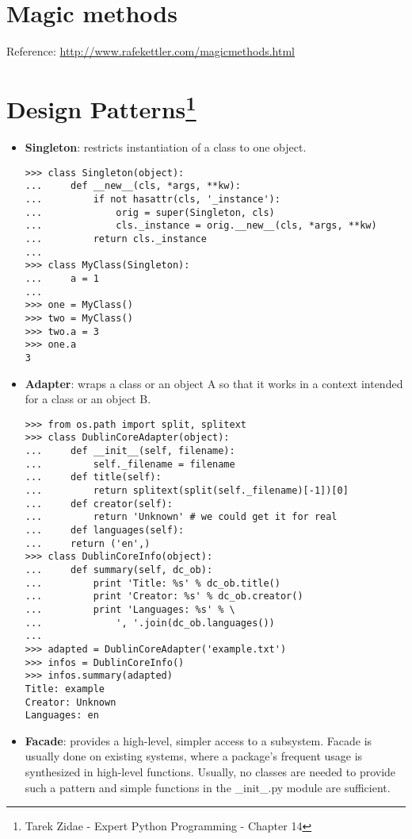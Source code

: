 \documentclass[fleqn,10pt]{SelfArx} %
\begin{document}
	
	\section{Magic methods}

	Reference: \url{http://www.rafekettler.com/magicmethods.html}
	
	\section[Design Patterns]{Design Patterns\footnote{Tarek Zidae - Expert Python Programming - Chapter 14}}

	\begin{itemize}
		\item \textbf{Singleton}: restricts instantiation of a class to one object.
		
	\begin{lstlisting}
>>> class Singleton(object):
... 	def __new__(cls, *args, **kw):
... 		if not hasattr(cls, '_instance'):
... 			orig = super(Singleton, cls)
... 			cls._instance = orig.__new__(cls, *args, **kw)
... 		return cls._instance
... 
>>> class MyClass(Singleton):
... 	a = 1
... 
>>> one = MyClass()
>>> two = MyClass()
>>> two.a = 3
>>> one.a
3
	\end{lstlisting}	
		
		\item \textbf{Adapter}: wraps a class or an object A so that it works in a context intended for a class or an object B.
		
	\begin{lstlisting}
>>> from os.path import split, splitext
>>> class DublinCoreAdapter(object):
... 	def __init__(self, filename):
... 		self._filename = filename
... 	def title(self):
... 		return splitext(split(self._filename)[-1])[0]
... 	def creator(self):
... 		return 'Unknown' # we could get it for real
... 	def languages(self):
... 	return ('en',)
>>> class DublinCoreInfo(object):
... 	def summary(self, dc_ob):
... 		print 'Title: %s' % dc_ob.title()
... 		print 'Creator: %s' % dc_ob.creator()
... 		print 'Languages: %s' % \
... 			', '.join(dc_ob.languages())
... 
>>> adapted = DublinCoreAdapter('example.txt')
>>> infos = DublinCoreInfo()
>>> infos.summary(adapted)
Title: example
Creator: Unknown
Languages: en
	\end{lstlisting}
	
	\item \textbf{Facade}: provides a high-level, simpler access to a subsystem. Facade is usually done on existing systems, where a package's frequent usage is synthesized in high-level functions. Usually, no classes are needed to provide such a pattern and simple functions in the \_init\_.py module are sufficient.
	

\end{itemize}
\end{document}
